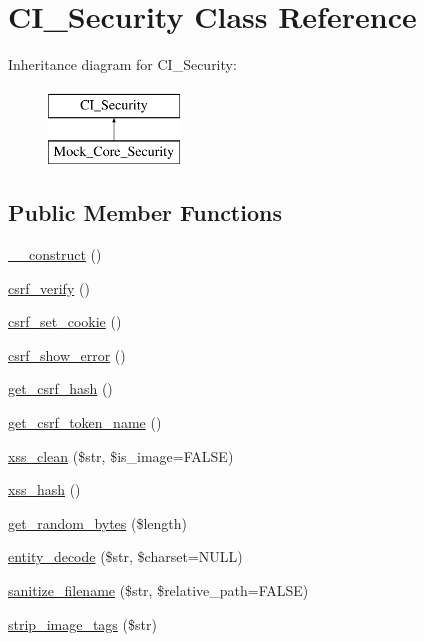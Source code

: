 \hypertarget{class_c_i___security}{}\section{C\+I\+\_\+\+Security Class Reference}
\label{class_c_i___security}
Inheritance diagram for C\+I\+\_\+\+Security\+:\begin{figure}[H]
\begin{center}
\leavevmode
\includegraphics[height=2.000000cm]{class_c_i___security}
\end{center}
\end{figure}
\subsection*{Public Member Functions}
\begin{DoxyCompactItemize}
\item 
\hyperlink{class_c_i___security_a095c5d389db211932136b53f25f39685}{\+\_\+\+\_\+construct} ()
\item 
\hyperlink{class_c_i___security_a03c037268db0c2e6221b65a736eaee07}{csrf\+\_\+verify} ()
\item 
\hyperlink{class_c_i___security_a55b1380b93b71ab3d9873bb967c2b9bb}{csrf\+\_\+set\+\_\+cookie} ()
\item 
\hyperlink{class_c_i___security_a3d09c1dc706abfaad987661805c28a06}{csrf\+\_\+show\+\_\+error} ()
\item 
\hyperlink{class_c_i___security_a1644fd8967db3a1b94988d730ca34991}{get\+\_\+csrf\+\_\+hash} ()
\item 
\hyperlink{class_c_i___security_a00640f51b90b7d946e9d3a4f0c9f628e}{get\+\_\+csrf\+\_\+token\+\_\+name} ()
\item 
\hyperlink{class_c_i___security_acb759426dbab128d3d8164805225381c}{xss\+\_\+clean} (\$str, \$is\+\_\+image=F\+A\+L\+S\+E)
\item 
\hyperlink{class_c_i___security_ae2f831d3f277e1c03730b28fd1734186}{xss\+\_\+hash} ()
\item 
\hyperlink{class_c_i___security_a7d1d64e6798b98cb46fcdb304a4e1de2}{get\+\_\+random\+\_\+bytes} (\$length)
\item 
\hyperlink{class_c_i___security_a8bec9918f4d35c9e6340e1dc6a32ba14}{entity\+\_\+decode} (\$str, \$charset=N\+U\+L\+L)
\item 
\hyperlink{class_c_i___security_aaba16489285496bdc03fd12f699a08f6}{sanitize\+\_\+filename} (\$str, \$relative\+\_\+path=F\+A\+L\+S\+E)
\item 
\hyperlink{class_c_i___security_abb836a42971c7bc641588db779c6ab1d}{strip\+\_\+image\+\_\+tags} (\$str)
\end{DoxyCompactItemize}
